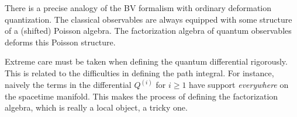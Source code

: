 \documentclass[10pt]{amsart}
\begin{document}
There is a precise analogy of the BV formalism with ordinary deformation quantization.
The classical observables are always equipped with some structure of a (shifted) Poisson algebra. 
The factorization algebra of quantum observables deforms this Poisson structure. 

Extreme care must be taken when defining the quantum differential rigorously.
This is related to the difficulties in defining the path integral.  
For instance, naively the terms in the differential $Q^{(i)}$ for $i \geq 1$ have support {\em everywhere} on the spacetime manifold. 
This makes the process of defining the factorization algebra, which is really a local object, a tricky one. 

%
%
%
%
%
\end{document}
